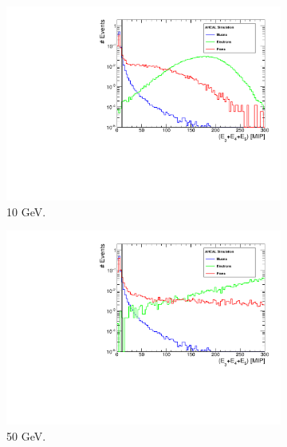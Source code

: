 \begin{figure}[htbp!]
	\begin{subfigure}[t]{0.5\textwidth}
		\centering
		\includegraphics[width=1\linewidth]{../Thesis_Plots/Timing/Electrons/Plots/SelectionCut_EnergyE3_10GeV}
		\caption{10 GeV.} \label{fig:e10GeV_E3}
	\end{subfigure}
	\hfill
	\begin{subfigure}[t]{0.5\textwidth}
		\centering
		\includegraphics[width=1\linewidth]{../Thesis_Plots/Timing/Electrons/Plots/SelectionCut_EnergyE3_50GeV}
		\caption{50 GeV.} \label{fig:e50GeV_E3}
	\end{subfigure}
	\hfill
	\begin{subfigure}[t]{0.5\textwidth}
		\centering

\end{subfigure}
\end{figure}
